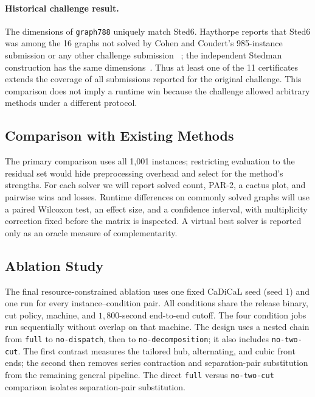 \documentclass[sigconf,anonymous]{aamas}
\begin{document}
\paragraph{Historical challenge result.}
The dimensions of \texttt{graph788} uniquely match Sted6. Haythorpe
reports that Sted6 was among the 16 graphs not solved by Cohen and
Coudert's 985-instance submission or any other challenge submission
~\cite{haythorpe2018fhcp}; the independent Stedman construction has the
same dimensions~\cite{haythorpe2019change}. Thus at least one of the 11
certificates extends the coverage of all submissions reported for the
original challenge. This comparison does not imply a runtime win because
the challenge allowed arbitrary methods under a different protocol.

\subsection{Comparison with Existing Methods}
\label{sec:comparison}

The primary comparison uses all 1,001 instances; restricting evaluation
to the residual set would hide preprocessing overhead and select for the
method's strengths. For each solver we will report solved count, PAR-2,
a cactus plot, and pairwise wins and losses. Runtime differences on
commonly solved graphs will use a paired Wilcoxon test, an effect size,
and a confidence interval, with multiplicity correction fixed before the
matrix is inspected. A virtual best solver is reported only as an oracle
measure of complementarity.

\subsection{Ablation Study}
\label{sec:ablation}

The final resource-constrained ablation uses one fixed CaDiCaL seed
(seed 1) and one run for every instance--condition pair. All conditions
share the release binary, cut policy, machine, and
$1{,}800$-second end-to-end cutoff. The four condition jobs run
sequentially without overlap on that machine. The design uses a nested
chain from
\texttt{full} to \texttt{no-dispatch}, then to
\texttt{no-decomposition}; it also includes \texttt{no-two-cut}. The first contrast
measures the tailored hub, alternating, and cubic front ends; the second
then removes series contraction and separation-pair substitution from
the remaining general pipeline. The direct \texttt{full} versus
\texttt{no-two-cut} comparison isolates separation-pair substitution.
\end{document}
